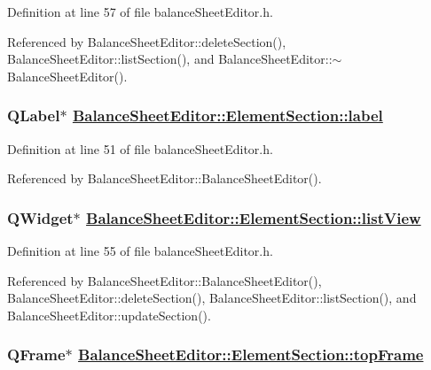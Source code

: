 Definition at line 57 of file balance\-Sheet\-Editor.h.

Referenced by Balance\-Sheet\-Editor::delete\-Section(), Balance\-Sheet\-Editor::list\-Section(), and Balance\-Sheet\-Editor::$\sim$Balance\-Sheet\-Editor().\hypertarget{structBalanceSheetEditor_1_1ElementSection_o2}{
\subsubsection[label]{\setlength{\rightskip}{0pt plus 5cm}QLabel$\ast$ \hyperlink{structBalanceSheetEditor_1_1ElementSection_o2}{Balance\-Sheet\-Editor::Element\-Section::label}}}
\label{structBalanceSheetEditor_1_1ElementSection_o2}


Definition at line 51 of file balance\-Sheet\-Editor.h.

Referenced by Balance\-Sheet\-Editor::Balance\-Sheet\-Editor().\hypertarget{structBalanceSheetEditor_1_1ElementSection_o6}{
\subsubsection[listView]{\setlength{\rightskip}{0pt plus 5cm}QWidget$\ast$ \hyperlink{structBalanceSheetEditor_1_1ElementSection_o6}{Balance\-Sheet\-Editor::Element\-Section::list\-View}}}
\label{structBalanceSheetEditor_1_1ElementSection_o6}


Definition at line 55 of file balance\-Sheet\-Editor.h.

Referenced by Balance\-Sheet\-Editor::Balance\-Sheet\-Editor(), Balance\-Sheet\-Editor::delete\-Section(), Balance\-Sheet\-Editor::list\-Section(), and Balance\-Sheet\-Editor::update\-Section().\hypertarget{structBalanceSheetEditor_1_1ElementSection_o0}{
\subsubsection[topFrame]{\setlength{\rightskip}{0pt plus 5cm}QFrame$\ast$ \hyperlink{structBalanceSheetEditor_1_1ElementSection_o0}{Balance\-Sheet\-Editor::Element\-Section::top\-Frame}}}
\label{structBalanceSheetEditor_1_1ElementSection_o0}


